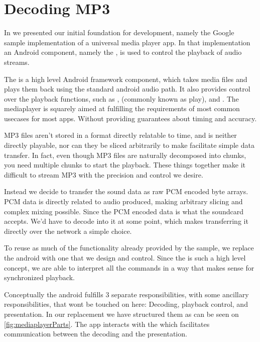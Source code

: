 \section{Decoding MP3}

In  we presented our initial
foundation for development, namely the Google sample implementation of
a universal media player app. In that implementation an Android
component, namely the , is used to
control the playback of audio streams.

The  is a high level Android framework component,
which takes media files and plays them back using the standard android
audio path. It also provides control over the playback functions, such
as ,  (commonly known as play), and
. The mediaplayer is squarely aimed at fulfilling the
requirements of most common usecases for most apps. Without providing
guarantees about timing and accuracy.

MP3 files aren't stored in a format directly relatable to time, and
is neither directly playable, nor can they be sliced arbitrarily to make
facilitate simple data transfer. In fact, even though MP3 files are
naturally decomposed into chunks, you need multiple chunks to start the
playback. These things together make it difficult to stream MP3 with the
precision and control we desire.

Instead we decide to transfer the sound data as raw \ac{PCM} encoded
byte arrays. \ac{PCM} data is directly related to audio produced, making
arbitrary slicing and complex mixing possible. Since the \ac{PCM}
encoded data is what the soundcard accepts. We'd have to decode into it
at some point, which makes transferring it directly over the network
a simple choice.

To reuse as much of the functionality already provided by the sample, we
replace the android  with one that we design and
control. Since the  is such a high level concept, we
are able to interpret all the commands in a way that makes sense for
synchronized playback.

Conceptually the android  fulfills 3 separate
responsibilities, with some ancillary responsibilities, that wont be
touched on here: Decoding, playback control, and presentation. In our
replacement we have structured them as can be seen on
\cref{fig:mediaplayerParts}. The app interacts with the  which facilitates communication between the decoding and the
presentation.

